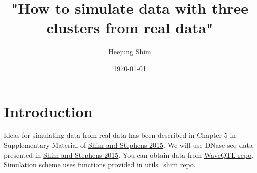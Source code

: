 \documentclass[11pt]{article}
\author{Heejung Shim}
\date{\today}
\title{"How to simulate data with three clusters from real data"}
\begin{document}
\maketitle
\tableofcontents


\section{Introduction}
\label{sec-1}
Ideas for simulating data from real data has been described in Chapter 5 in Supplementary Material of \href{http://projecteuclid.org/euclid.aoas/1437397106}{Shim and Stephens 2015}. We will use DNase-seq data presented in \href{http://projecteuclid.org/euclid.aoas/1437397106}{Shim and Stephens 2015}.
You can obtain data from \href{https://github.com/heejungshim/WaveQTL}{WaveQTL repo}. Simulation scheme uses functions provided in \href{https://github.com/heejungshim/utils_shim/}{utils\_shim repo}.
\end{document}
